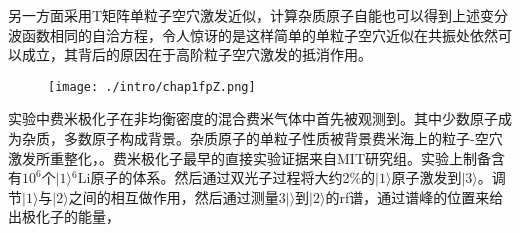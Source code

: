 另一方面采用T矩阵单粒子空穴激发近似，计算杂质原子自能也可以得到上述变分波函数相同的自洽方程\cite{Combescot20071ph}，令人惊讶的是这样简单的单粒子空穴近似在共振处依然可以成立，其背后的原因在于高阶粒子空穴激发的抵消作用\cite{Combescot20071ph008full}。
\begin{figure}[!htbp]
    \centering
    \texttt{[image: ./intro/chap1fpZ.png]}
    \label{fpZ}
\end{figure}
实验中费米极化子在非均衡密度的混合费米气体中首先被观测到。其中少数原子成为杂质，多数原子构成背景。杂质原子的单粒子性质被背景费米海上的粒子-空穴激发所重整化，。费米极化子最早的直接实验证据来自MIT研究组\cite{Schirotzekobservation}。实验上制备含有$10^6$个$|1\rangle{}^6$Li原子的体系。然后通过双光子过程将大约$2\%$的$|1\rangle$原子激发到$|3\rangle$。调节$|1\rangle$与$|2\rangle$之间的相互做作用，然后通过测量$3|\rangle$到$|2\rangle$的rf谱，通过谱峰的位置来给出极化子的能量，

\begin{comment}
如图~\ref{fpE}~所示。
\begin{figure}[!htbp]
    \centering
    \texttt{[image: chap1fpE.png]}
    \bicaption{图a为实验测到的（散点）以及理论预测（黑色实线）的费米极化子能量随相互作用变化曲线。图b为rf谱峰的位置随杂质密度的变化。摘自\citep{Schirotzekobservation}}{Fig(a) for measured and predicted energy of fermi polaron upon interaction. Fig(b) for rf spectrum peak position upon impurity densuty. Reprinted from\citep{Schirotzekobservation}}
    \label{fpE}
\end{figure}
可以看到，即使在共振点处，理论计算的能量与实验测到的能量也符合很好。并且谱峰的位置受杂质密度变化影响较小，处于低密度区间。
\end{comment}



